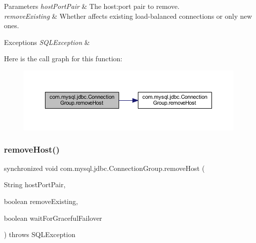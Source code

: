\begin{DoxyParams}{Parameters}
{\em host\+Port\+Pair} & The host\+:port pair to remove. \\
\hline
{\em remove\+Existing} & Whether affects existing load-\/balanced connections or only new ones. \\
\hline
\end{DoxyParams}

\begin{DoxyExceptions}{Exceptions}
{\em S\+Q\+L\+Exception} & \\
\hline
\end{DoxyExceptions}
Here is the call graph for this function\+:\nopagebreak
\begin{figure}[H]
\begin{center}
\leavevmode
\includegraphics[width=350pt]{classcom_1_1mysql_1_1jdbc_1_1_connection_group_ac1cffa2544420e1e0304129257c97a91_cgraph}
\end{center}
\end{figure}
\mbox{\label{classcom_1_1mysql_1_1jdbc_1_1_connection_group_a27586faf64da09b716633d8af113a9ba}} 
\subsubsection{\texorpdfstring{remove\+Host()}{removeHost()}\hspace{0.1cm}{\footnotesize\ttfamily [3/3]}}
{\footnotesize\ttfamily synchronized void com.\+mysql.\+jdbc.\+Connection\+Group.\+remove\+Host (\begin{DoxyParamCaption}\item[{String}]{host\+Port\+Pair,  }\item[{boolean}]{remove\+Existing,  }\item[{boolean}]{wait\+For\+Graceful\+Failover }\end{DoxyParamCaption}) throws S\+Q\+L\+Exception}

